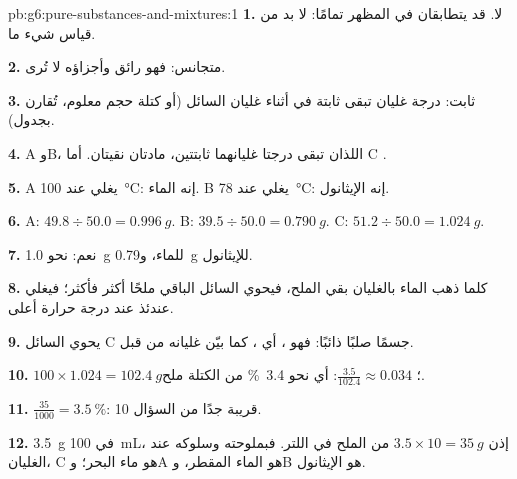 \begin{solution}{pb:g6:pure-substances-and-mixtures:1}
\textbf{1.} لا.   قد يتطابقان في المظهر
تمامًا: لا بد من قياس شيء ما.

\textbf{2.} متجانس: فهو رائق وأجزاؤه لا تُرى.

\textbf{3.} ثابت: درجة غليان تبقى ثابتة في أثناء غليان السائل (أو كتلة
حجم معلوم، تُقارن بجدول).

\textbf{4.} A وB، اللذان تبقى درجتا غليانهما ثابتتين، مادتان نقيتان.
أما C .

\textbf{5.} A يغلي عند \qty{100}{\celsius}: إنه الماء. B يغلي عند
\qty{78}{\celsius}: إنه الإيثانول.

\textbf{6.} A: $49.8 \div 50.0 = \qty{0.996}{g}$. B: $39.5 \div 50.0 =
\qty{0.790}{g}$. C: $51.2 \div 50.0 = \qty{1.024}{g}$.

\textbf{7.} نعم: نحو \qty{1.0}{g} للماء، و\qty{0.79}{g} للإيثانول.

\textbf{8.} كلما ذهب الماء بالغليان بقي الملح، فيحوي السائل الباقي ملحًا
أكثر فأكثر؛ فيغلي عندئذ عند درجة حرارة أعلى.

\textbf{9.} يحوي السائل C جسمًا صلبًا ذائبًا: فهو ، أي ، كما بيّن
غليانه من قبل.

\textbf{10.} $100 \times 1.024 = \qty{102.4}{g}$؛ $\frac{3.5}{102.4}
\approx 0.034$: أي نحو \qty{3.4}{\percent} من الكتلة ملح.

\textbf{11.} $\frac{35}{1000} = \qty{3.5}{\percent}$: قريبة جدًا من
السؤال 10.

\textbf{12.} \qty{3.5}{g} في \qty{100}{mL}، إذن $3.5 \times 10 =
\qty{35}{g}$ من الملح في اللتر. فبملوحته وسلوكه عند الغليان، C هو ماء
البحر؛ وA هو الماء المقطر، وB هو الإيثانول.
\end{solution}

